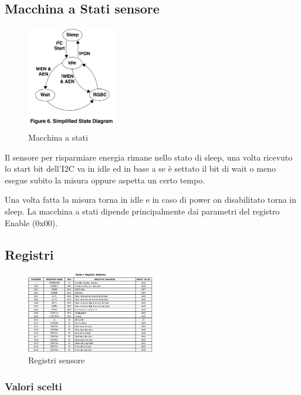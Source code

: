 \documentclass[12pt]{report}
\begin{document}
\subsection{Macchina a Stati sensore}

\begin{figure}[h]
    \centering
    \includegraphics[width=0.35\textwidth]{images/Immagini sensore/macchina a stati.png}
    \caption{Macchina a stati}
\end{figure}

Il sensore per risparmiare energia rimane nello stato di sleep, una volta ricevuto lo start bit dell'I2C va in idle ed in base a se è settato il bit di wait o meno esegue subito la misura oppure aspetta un certo tempo.

Una volta fatta la misura torna in idle e in caso di power on disabilitato torna in sleep. La macchina a stati dipende principalmente dai parametri del registro Enable (0x00).

\subsection{Registri}

\begin{figure}[h]
    \centering
    \includegraphics[width=0.5\textwidth]{images/Immagini sensore/Indirizzi sensore.png}
    \caption{Registri sensore}
\end{figure}

\subsubsection{Valori scelti}
\end{document}
